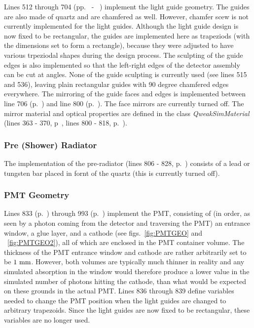 Lines 512 through 704 (pp.~\pageref{SourceV9} - ~\pageref{SourceV11})
implement the light guide geometry. The guides are also made of quartz
and are chamfered as well. However, chamfer scew is not currently
implemented for the light guides. Although the light guide design is
now fixed to be rectangular, the guides are implemented here as
trapeziods (with the dimensions set to form a rectangle), because they
were adjusted to have various trpeziodal shapes during the design
process. The sculpting of the guide edges is also implemented so that
the left-right edges of the detector assembly can be cut at angles.
None of the guide sculpting is currently used (see lines 515 and 536),
leaving plain rectangular guides with 90 degree chamfered edges
everywhere. The mirroring of the guide faces and edges is implemented
between line 706 (p.~\pageref{SourceV12}) and line 800 (p.~\pageref{SourceV13}).
The face mirrors are currently turned off. The mirror material and 
optical properties are defined in the class {\it QweakSimMaterial}
(lines 363 - 370, p~\pageref{SourceXVII7}, 
lines 800 - 818, p.~\pageref{SourceXVII14}). 

\subsubsection{Pre (Shower) Radiator}

The implementation of the pre-radiator (lines 806 - 828,
p.~\pageref{SourceV13}) consists of a lead or tungsten bar placed in
fornt of the quartz (this is currently turned off).

\subsubsection{PMT Geometry}

Lines 833 (p.~\pageref{SourceV14}) through 993
(p.~\pageref{SourceV16}) implement the PMT, consisting of (in order,
as seen by a photon coming from the detector and traversing the PMT)
an entrance window, a glue layer, and a cathode (see
figs.~\ref{fig:PMTGEO} and ~\ref{fig:PMTGEO2}), all of which are
enclosed in the PMT container volume.  The thickness of the PMT
entrance window and cathode are rather arbitrarily set to be $1 {~\rm
mm}$. However, both volumes are typically much thinner in reality and
any simulated absorption in the window would therefore produce a lower
value in the simulated number of photons hitting the cathode, than
what would be expected on these grounds in the actual PMT. Lines 836
through 839 define variables needed to change the PMT position when
the light guides are changed to arbitrary trapezoids. Since the light
guides are now fixed to be rectangular, these variables are no longer
used.

